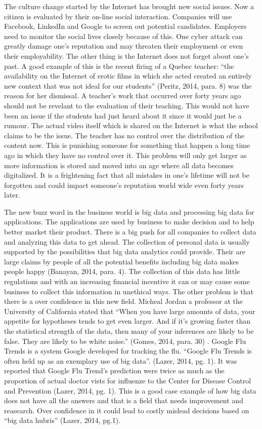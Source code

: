 \documentclass[12pt]{article}
\begin{document}
The culture change started by the Internet has brought new social issues. Now a citizen is evaluated by their on-line social interaction. Companies will use Facebook, LinkedIn and Google to screen out potential candidates. Employers need to monitor the social lives closely because of this. One cyber attack can greatly damage one's reputation and may threaten their employment or even their employability. The other thing is the Internet does not forget about one's past. A good example of this is the recent firing of a Quebec teacher: ``the availability on the Internet of erotic films in which she acted created an entirely new context that was not ideal for our students'' (Peritz, 2014, para. 8) was the reason for her dismissal. A teacher's work that occurred over forty years ago should not be revelant to the evaluation of their teaching. This would not have been an issue if the students had just heard about it since it would just be a rumour. The actual video itself which is shared on the Internet is what the school claims to be the issue. The teacher has no control over the distribution of the content now. This is punishing someone for something that happen a long time ago in which they have no control over it. This problem will only get larger as more information is stored and moved into an age where all data becomes digitalized. It is a frightening fact that all mistakes in one's lifetime will not be forgotten and could impact someone's reputation world wide even forty years later.

The new buzz word in the business world is big data and processing big data for applications. The applications are used by business to make decision and to help better market their product. There is a big push for all companies to collect data and analyzing this data to get ahead. The collection of personal data is usually supported by the possibilities that big data analytics could provide. Their are large claims by people of all the potential benefits including big data makes people happy (Banayan, 2014, para. 4). The collection of this data has little regulations and with an increasing financial incentive it can or may cause some business to collect this information in unethical ways. The other problem is that there is a over confidence in this new field. Micheal Jordan a professor at the University of California stated that ``When you have large amounts of data, your appetite for hypotheses tends to get even larger. And if it’s growing faster than the statistical strength of the data, then many of your inferences are likely to be false. They are likely to be white noise.'' (Gomes, 2014, para. 30) . Google Flu Trends is a system Google developed for tracking the flu. ``Google Flu Trends is often held up as an exemplary use of big data''. (Lazer, 2014, pg. 1). It was reported that Google Flu Trend's prediction were twice as much as the proportion of actual doctor vists for influenze to the Center for Disease Control and Prevention (Lazer, 2014, pg. 1). This is a good case example of how big data does not have all the answers and that is a field that needs improvement and reasearch. Over confidence in it could lead to costly mislead decisions based on ``big data hubris'' (Lazer, 2014, pg.1).
\end{document}
